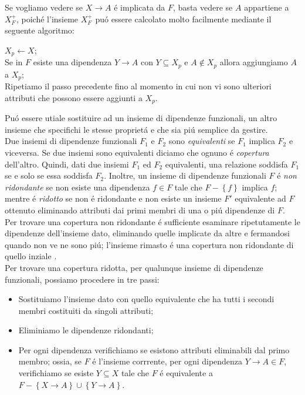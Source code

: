 \documentclass[11pt]{article}
\begin{document}
Se vogliamo vedere se $X \rightarrow A$ \'e implicata da $F$, basta vedere se $A$ appartiene a $X_F^{+}$, poich\'e l'insieme $X_F^{+}$ pu\'o essere calcolato molto facilmente mediante il seguente algoritmo:
\begin{algorithm}
	\BlankLine
	$X_p \leftarrow X$; \\
	Se in $F$ esiste una dipendenza $Y \rightarrow A$ con $Y \subseteq X_p$ e $A \notin X_p$ allora aggiungiamo $A$ a $X_p$; \\
	Ripetiamo il passo precedente fino al momento in cui non vi sono ulteriori attributi che possono essere aggiunti a $X_p$.
\end{algorithm}
Pu\'o essere utiale sostituire ad un insieme di dipendenze funzionali, un altro insieme che specifichi le stesse propriet\'a e che sia pi\'u semplice da gestire. \\
Due insiemi di dipendenze funzionali $F_1$ e $F_2$ sono \textit{equivalenti} se $F_1$ implica $F_2$ e viceversa. Se due insiemi sono equivalenti diciamo che ognuno \'e \textit{copertura} dell'altro. Quindi, dati due insiemi $F_1$ ed $F_2$ equivalenti, una relazione soddisfa $F_1$ se e solo se essa soddisfa $F_2$. Inoltre, un insieme di dipendenze funzionali $F$ \'e \textit{non ridondante} se non esiste una dipendenza $f \in F$ tale che $F - \left\{f\right\}$ implica $f$; mentre \'e \textit{ridotto} se non \'e ridondante e non esiste un insieme $F'$ equivalente ad $F$ ottenuto eliminando attributi dai primi membri di una o pi\'u dipendenze di $F$. \\
Per trovare una copertura non ridondante \'e sufficiente esaminare ripetutamente le dipendenze dell'insieme dato, eliminando quelle implicate da altre e fermandosi quando non ve ne sono pi\'u; l'insieme rimasto \'e una copertura non ridondante di quello inziale  \cite{atzeni1999basi}. \\
Per trovare una copertura ridotta, per qualunque insieme di dipendenze funzionali, possiamo procedere in tre passi:
\begin{itemize}
	\item Sostituiamo l'insieme dato con quello equivalente che ha tutti i secondi membri costituiti da singoli attributi;
	\item Eliminiamo le dipendenze ridondanti;
	\item Per ogni dipendenza verifichiamo se esistono attributi eliminabili dal primo membro; ossia, se $F$ \'e l'insieme corrrente, per ogni dipendenza $Y \rightarrow A \in F$, verifichiamo se esiste $Y \subseteq X$ tale che $F$ \'e equivalente a $F - \left\{ X \rightarrow A \right\} \cup \left\{ Y \rightarrow A \right\} $.
\end{itemize}
\end{document}
